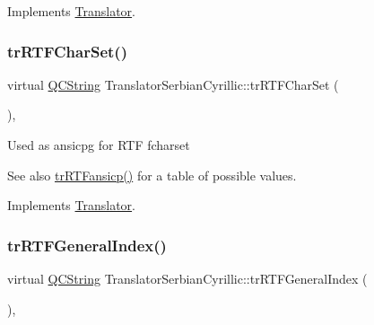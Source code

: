 Implements \mbox{\hyperlink{class_translator_a9953a4c0e6a4fc7d017abcd5c2939e0f}{Translator}}.

\mbox{\label{class_translator_serbian_cyrillic_a56d543bd8cb47b0e1a08df7774bbea22}} 
\subsubsection{\texorpdfstring{trRTFCharSet()}{trRTFCharSet()}}
{\footnotesize\ttfamily virtual \mbox{\hyperlink{class_q_c_string}{Q\+C\+String}} Translator\+Serbian\+Cyrillic\+::tr\+R\+T\+F\+Char\+Set (\begin{DoxyParamCaption}{ }\end{DoxyParamCaption})\hspace{0.3cm}{\ttfamily [inline]}, {\ttfamily [virtual]}}

Used as ansicpg for R\+TF fcharset \begin{DoxySeeAlso}{See also}
\mbox{\hyperlink{class_translator_serbian_cyrillic_a6dcfdb3f544c2e1e32673d81c088b9e3}{tr\+R\+T\+Fansicp()}} for a table of possible values. 
\end{DoxySeeAlso}


Implements \mbox{\hyperlink{class_translator_afad391f3cbfb5ce6332b7239f8e2049a}{Translator}}.

\mbox{\label{class_translator_serbian_cyrillic_a4ca343d261128739b6b3140bb98a20f0}} 
\subsubsection{\texorpdfstring{trRTFGeneralIndex()}{trRTFGeneralIndex()}}
{\footnotesize\ttfamily virtual \mbox{\hyperlink{class_q_c_string}{Q\+C\+String}} Translator\+Serbian\+Cyrillic\+::tr\+R\+T\+F\+General\+Index (\begin{DoxyParamCaption}{ }\end{DoxyParamCaption})\hspace{0.3cm}{\ttfamily [inline]}, {\ttfamily [virtual]}}

